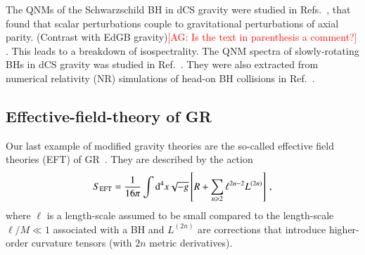 \documentclass[twocolumn,
               prd,
               aps,
               superscriptaddress,
               tightenlines,
               nofootinbib,
               eqsecnum,
               amsfonts,
               amsmath,
               longbibliography]{revtex4-1}
\newcommand{\dd}{{\rm d}}
\newcommand{\agcomm}[1]{{\textcolor{red}{{[AG: #1]}} }}
\begin{document}
The QNMs of the Schwarzschild BH in dCS gravity were studied in
Refs.~\cite{Yunes:2007ss,Cardoso:2009pk,Molina:2010fb}, that found that scalar
perturbations couple to gravitational perturbations of axial parity. (Contrast
with EdGB gravity)\agcomm{Is the text in parenthesis a comment?}.
%
This leads to a breakdown of isospectrality. The QNM spectra of slowly-rotating BHs in dCS gravity was
studied in Ref.~\cite{Wagle:2021tam}.
%
They were also extracted from numerical relativity (NR) simulations of head-on BH collisions
in Ref.~\cite{Okounkova:2019dfo}.

\subsection{Effective-field-theory of GR}

Our last example of modified gravity theories are the so-called effective field
theories (EFT) of GR~\cite{Endlich:2017tqa,Sennett:2019bpc,deRham:2020ejn,Cano:2020cao,Cano:2021myl}.
%
They are described by the action
%
\begin{equation} \label{eq:action_eft}
    S_{\rm EFT} = \frac{1}{16 \pi}
    \int \dd^4x \sqrt{-g}
    \left[ R
    +
    \sum_{n \geqslant 2} \ell^{2n - 2} L^{(2n)}
    \right]\,,
\end{equation}
%
where $\ell$ is a length-scale assumed to be small compared to the length-scale
$\ell / M \ll 1$ associated with a BH and $L^{(2n)}$ are corrections
that introduce higher-order curvature tensors (with $2n$ metric derivatives).
\end{document}

